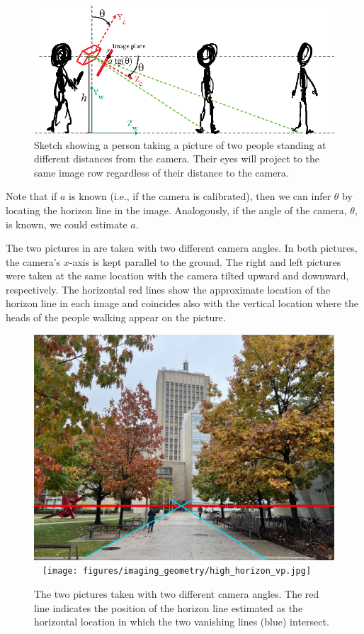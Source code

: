 \begin{figure}[t]
\centerline{
\includegraphics[width=.9\linewidth]{figures/imaging_geometry/eyes_location.eps}
}
\caption{Sketch showing a person taking a picture of two people standing at different distances from the camera. Their eyes will project to the same image row regardless of their distance to the camera.}
\label{fig:sketch_eyes_location}
\end{figure}

Note that if $a$ is known (i.e., if the camera is calibrated), then we can infer $\theta$ by locating the horizon line in the image. Analogously, if the angle of the camera, $\theta$, is known, we could estimate $a$.


The two pictures in \fig{\ref{fig:low_and_high_horizon}} are taken with two different camera angles. In both pictures, the camera's $x$-axis is kept parallel to the ground. The right and left pictures were taken at the same location with the camera tilted upward and downward, respectively. The horizontal red lines show the approximate location of the horizon line in each image and coincides also with the vertical location where the heads of the people walking appear on the picture. 

\begin{figure}[t]
\centerline{
\includegraphics[width=.48\linewidth]{figures/imaging_geometry/low_horizon_vp.jpg}
~
\texttt{[image: figures/imaging\_geometry/high\_horizon\_vp.jpg]}
}
\caption{The two pictures taken with two different camera angles. The red line indicates the position of the horizon line estimated as the horizontal location in which the two vanishing lines (blue) intersect.}
\label{fig:low_and_high_horizon}
\end{figure}

